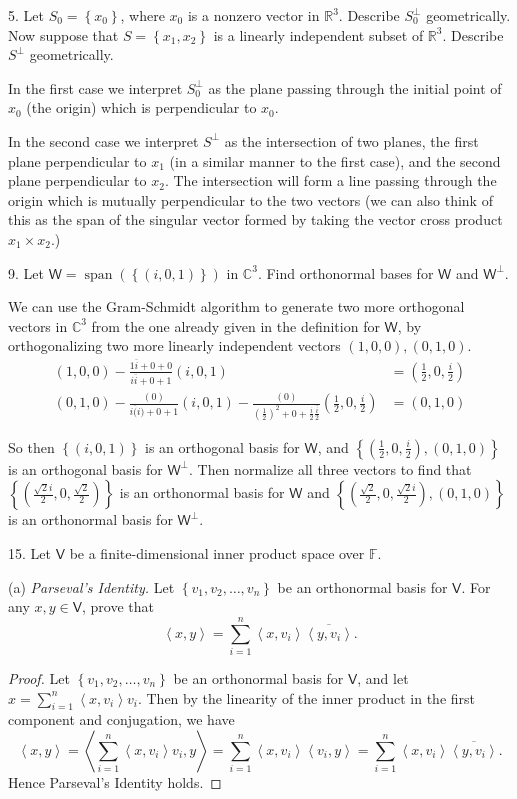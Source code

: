 \documentclass[11pt]{article}
\newcommand{\br}[1]{\left(#1\right)}
\newcommand{\cbr}[1]{\left\{#1\right\}}
\newcommand{\abr}[1]{\left\langle#1\right\rangle}
\DeclareMathOperator{\Span}{span}
\begin{document}
5. Let $S_0 = \cbr{x_0}$, where $x_0$ is a nonzero vector in $\mathbb{R}^3$. Describe $S_0^{\perp}$ geometrically. Now suppose that $S = \cbr{x_1,x_2}$ is a linearly independent subset of $\mathbb{R}^3$. Describe $S^\perp$ geometrically.

In the first case we interpret $S_0^{\perp}$ as the plane passing through the initial point of $x_0$ (the origin) which is perpendicular to $x_0$. 

In the second case we interpret $S^\perp$ as the intersection of two planes, the first plane perpendicular to $x_1$ (in a similar manner to the first case), and the second plane perpendicular to $x_2$. The intersection will form a line passing through the origin which is mutually perpendicular to the two vectors (we can also think of this as the span of the singular vector formed by taking the vector cross product $x_1\times x_2$.)

9. Let $\mathsf{W} = \Span(\cbr{(i,0,1)})$ in $\mathbb{C}^3$. Find orthonormal bases for $\mathsf{W}$ and $\mathsf{W}^\perp$. 

We can use the Gram-Schmidt algorithm to generate two more orthogonal vectors in $\mathbb{C}^3$ from the one already given in the definition for $\mathsf{W}$, by orthogonalizing two more linearly independent vectors $(1,0,0), (0,1,0)$. \begin{align*}
  (1,0,0) - \frac{1\overline{i} + 0 + 0 }{i\overline{i} + 0 + 1}(i,0,1) &= \br{\frac{1}{2}, 0, \frac{i}{2}} \\ 
  (0,1,0) - \frac{(0)}{i\overline(i)+ 0 + 1}(i,0,1) - \frac{(0)}{\br{\frac{1}{2}}^2 + 0 + \frac{i}{2}\overline{\frac{i}{2}}}\br{\frac{1}{2}, 0, \frac{i}{2}} &= (0,1,0)
\end{align*}

So then $\cbr{(i,0,1)}$ is an orthogonal basis for $\mathsf{W}$, and $\cbr{ \br{\frac{1}{2}, 0, \frac{i}{2}},(0,1,0) }$ is an orthogonal basis for $\mathsf{W}^\perp$. Then normalize all three vectors to find that $\cbr{\br{\frac{\sqrt{2}i}{2} , 0 , \frac{\sqrt{2}}{2} }}$ is an orthonormal basis for $\mathsf{W}$ and $\cbr{ \br{\frac{\sqrt{2}}{2} , 0 , \frac{\sqrt{2}i}{2}} , \br{0,1,0} }$ is an orthonormal basis for $\mathsf{W}^\perp$.

15. Let $\mathsf{V}$ be a finite-dimensional inner product space over $\mathbb{F}$.

(a) \textit{Parseval's Identity.} Let $\cbr{v_1,v_2,\dots,v_n}$ be an orthonormal basis for $\mathsf{V}$. For any $x,y \in\mathsf{V}$, prove that $$\abr{x,y} = \sum_{i=1}^n\abr{x,v_i}\overline{\abr{y,v_i}}.$$

\begin{proof}
  Let $\cbr{v_1,v_2,\dots,v_n}$ be an orthonormal basis for $\mathsf{V}$, and let $x = \sum_{i=1}^n\abr{x,v_i}v_i$. Then by the linearity of the inner product in the first component and conjugation, we have $$\abr{x,y} = \abr{\sum_{i=1}^n\abr{x,v_i}v_i, y} = \sum_{i=1}^n\abr{x,v_i}\abr{v_i,y} = \sum_{i=1}^n\abr{x,v_i}\overline{\abr{y, v_i}}.$$ Hence Parseval's Identity holds.
\end{proof}
\end{document}
